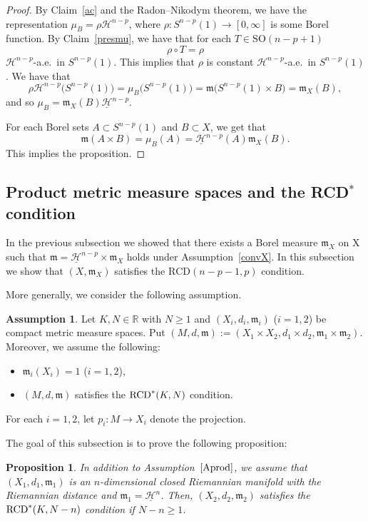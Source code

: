 \documentclass[pdftex]{sigma}
\numberwithin{equation}{section}
\newtheorem{Prop}[Thm]{Proposition}
\theoremstyle{definition}
\newtheorem{Asu}[Thm]{Assumption}
\newcommand{\R}{\mathbb{R}}
\newcommand{\mf}{\mathfrak{m}}
\newcommand{\RCD}{{\rm RCD}^\ast}
\newcommand{\Ha}{\mathcal{H}}
\newcommand{\nHa}{\underline{\mathcal{H}}}
\begin{document}
\begin{proof}
By Claim~\ref{ac} and the Radon--Nikodym theorem, we have the representation $\mu_B=\rho \Ha^{n-p}$, where $\rho\colon S^{n-p}(1)\to [0,\infty]$ is some Borel function.
By Claim~\ref{presmu}, we have that for each $T\in \mathrm{SO}(n-p+1)$
\[
\rho\circ T=\rho
\]
$\Ha^{n-p}$-a.e.\ in $S^{n-p}(1)$.
This implies that $\rho$ is constant $\Ha^{n-p}$-a.e.\ in $S^{n-p}(1)$.
We have that
\[
\rho\Ha^{n-p}\big(S^{n-p}(1)\big)=\mu_B\big(S^{n-p}(1)\big)=\mf\big(S^{n-p}(1)\times B\big)=\mf_X(B),
\]
and so $\mu_B=\mf_X(B)\nHa^{n-p}$.

For each Borel sets $A\subset S^{n-p}(1)$ and $B\subset X$, we get that
\[
\mf(A\times B)=\mu_B(A)=\nHa^{n-p}(A)\mf_X(B).
\tag*{\qed}
\]
\renewcommand{\qed}{}
This implies the proposition.
\end{proof}


\subsection[Product metric measure spaces and the RCD* condition]{Product metric measure spaces and the RCD$\boldsymbol{^*}$ condition}
In the previous subsection we showed that there exists a Borel measure $\mf_X$ on X such that $\mf=\nHa^{n-p}\times \mf_X$ holds under Assumption~\ref{convX}.
In this subsection we show that $(X,\mf_X)$ satisfies the $\mathrm{RCD}(n-p-1,p)$ condition.

More generally, we consider the following assumption.
\begin{Asu}\label{Aprod}
Let $K, N\in \R$ with $N\geq 1$ and $(X_i,d_i,\mf_i)$ ($i=1,2$) be compact metric measure spaces.
Put $(M,d,\mf):=(X_1\times X_2,d_1\times d_2,\mf_1\times \mf_2)$.
Moreover, we assume the following:
\begin{itemize}\itemsep=0pt
\item $\mf_i(X_i)=1$ ($i=1,2$),
\item $(M,d,\mf)$ satisfies the $\RCD(K,N)$ condition.
\end{itemize}
For each $i=1,2$, let $p_i\colon M\to X_i$ denote the projection.
\end{Asu}

The goal of this subsection is to prove the following proposition:

\begin{Prop}\label{KN-n}
In addition to Assumption~$\ref{Aprod}$, we assume that $(X_1,d_1,\mf_1)$ is an $n$-dimen\-sio\-nal closed Riemannian manifold with the Riemannian distance and $\mf_1=\nHa^n$.
Then, \linebreak $(X_2,d_2,\mf_2)$ satisfies the $\RCD(K,N-n)$ condition if $N-n\geq 1$.
\end{Prop}
\end{document}
